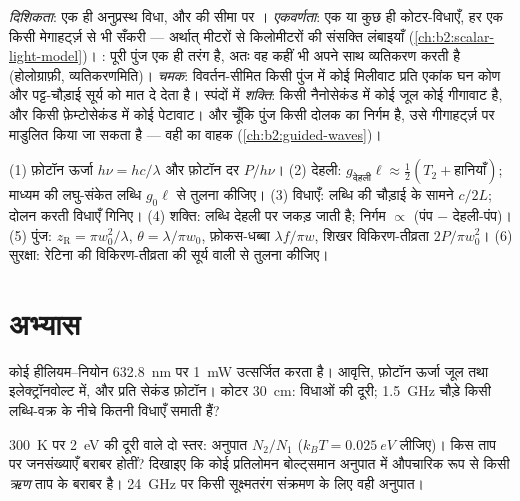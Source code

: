 \begin{remark}[लेज़र-प्रकाश ख़ास क्यों है]\label{rem:b2:laser:special}
\emph{दिशिकता}: एक ही अनुप्रस्थ विधा, और  की सीमा पर ।
\emph{एकवर्णता}: एक या कुछ ही कोटर-विधाएँ, हर एक
किसी मेगाहर्ट्ज़ से भी सँकरी --- अर्थात् मीटरों से किलोमीटरों की संसक्ति लंबाइयाँ
(\cref{ch:b2:scalar-light-model})। \emph{}: पूरी
पुंज एक ही तरंग है, अतः वह कहीं भी अपने साथ व्यतिकरण करती है (होलोग्राफ़ी,
व्यतिकरणमिति)। \emph{चमक}: विवर्तन-सीमित किसी पुंज में कोई मिलीवाट
प्रति एकांक घन कोण और पट्ट-चौड़ाई सूर्य को मात दे देता है। स्पंदों में
\emph{शक्ति}: किसी नैनोसेकंड में कोई जूल कोई गीगावाट है, और किसी फ़ेम्टोसेकंड में कोई
पेटावाट। और चूँकि पुंज किसी दोलक का निर्गम है, उसे गीगाहर्ट्ज़ पर
माडुलित किया जा सकता है --- वही  का वाहक
(\cref{ch:b2:guided-waves})।
\end{remark}

\begin{method}[लेज़र के आकलन]\label{meth:b2:laser:method}
(1) फ़ोटॉन ऊर्जा $h\nu = hc/\lambda$ और फ़ोटॉन दर $P/h\nu$।
(2) देहली: $g_{\text{देहली}}\ell \approx \tfrac12(T_2 + \text{हानियाँ})$;
माध्यम की लघु-संकेत लब्धि $g_0\ell$ से तुलना कीजिए।
(3) विधाएँ: लब्धि की चौड़ाई के सामने $c/2L$; दोलन करती विधाएँ गिनिए।
(4) शक्ति: लब्धि देहली पर जकड़ जाती है; निर्गम $\propto$ (पंप $-$
देहली-पंप)। (5) पुंज: $z_{\text{R}} = \pi w_0^2/\lambda$, $\theta =
\lambda/\pi w_0$, फ़ोकस-धब्बा $\lambda f/\pi w$, शिखर विकिरण-तीव्रता
$2P/\pi w_0^2$। (6) सुरक्षा: रेटिना की विकिरण-तीव्रता की सूर्य वाली से
तुलना कीजिए।
\end{method}

\section{अभ्यास}

\begin{exercise}[$\star$]\label{exo:b2:laser:1}
कोई हीलियम--नियोन  \qty{632.8}{nm} पर \qty{1}{mW} उत्सर्जित करता है। आवृत्ति, फ़ोटॉन
ऊर्जा जूल तथा इलेक्ट्रॉनवोल्ट में, और प्रति सेकंड फ़ोटॉन। कोटर
\qty{30}{cm}: विधाओं की दूरी; \qty{1.5}{GHz} चौड़े किसी लब्धि-वक्र के नीचे
कितनी विधाएँ समाती हैं?
\end{exercise}

\begin{exercise}[$\star$]\label{exo:b2:laser:2}
\qty{300}{K} पर \qty{2}{eV} की दूरी वाले दो स्तर: अनुपात $N_2/N_1$
($k_BT = \qty{0.025}{eV}$ लीजिए)। किस ताप पर जनसंख्याएँ
बराबर होतीं? दिखाइए कि कोई प्रतिलोमन बोल्ट्समान अनुपात में औपचारिक रूप से किसी
\emph{ऋण} ताप के बराबर है। \qty{24}{GHz} पर किसी सूक्ष्मतरंग
संक्रमण के लिए वही अनुपात।
\end{exercise}

